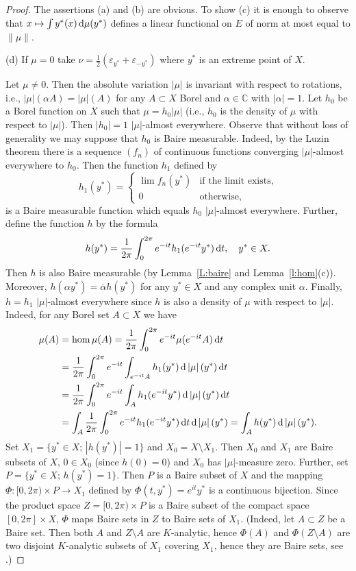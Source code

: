 \documentclass{amsart}
\numberwithin{equation}{section}
\theoremstyle{definition}
\def\ce{\mathbb C}
\def\ep{\varepsilon}
\def\ov{\overline}
\def\hom{\operatorname{hom}}
\def\di{\,\mbox{\rm d}}
\newcommand{\abs}[1]{\left| #1  \right|}
\newcommand{\setsep}{;\,}
\begin{document}
\begin{proof} The assertions (a) and (b) are obvious.
 To show (c) it is enough to observe that $x\mapsto \int y^*(x)\di\mu(y^*)$
 defines a linear functional on $E$ of norm at most equal to $\|\mu\|$.

(d) If $\mu=0$ take $\nu=\frac12(\ep_{y^*}+\ep_{-y^*})$ where $y^*$ is an extreme point of $X$.

Let $\mu\ne0$. Then the absolute variation $\abs{\mu}$ is invariant with respect to rotations, i.e., $\abs{\mu}(\alpha A)=\abs{\mu}(A)$ for any $A\subset X$ Borel and $\alpha\in\ce$ with $\abs{\alpha}=1$. Let $h_0$ be a Borel function on $X$ such that $\mu=h_0\abs{\mu}$ (i.e., $h_0$ is the density of $\mu$ with respect to $\abs{\mu}$). Then $\abs{h_0}=1$ $\abs{\mu}$-almost everywhere. Observe that without loss of generality we may suppose that $h_0$ is Baire measurable. Indeed, by the Luzin theorem there is a sequence $(f_n)$ of continuous functions converging $\abs{\mu}$-almost everywhere to $h_0$. Then the function $h_1$ defined by
$$h_1(y^*)=\begin{cases}\lim f_n(y^*) &\mbox{if the limit exists},\\ 0  &\mbox{otherwise},\end{cases}$$
is a Baire measurable function which equals $h_0$ $\abs{\mu}$-almost everywhere. Further, define the function $h$ by the formula
$$
h(y^*)=\frac1{2\pi}\int_0^{2\pi}e^{-it}h_1(e^{-it}y^*)\di t,\quad y^*\in X.
$$
Then $h$ is also Baire measurable (by Lemma~\ref{L:baire} and Lemma~\ref{l:hom}(c)). Moreover, $h(\alpha y^*)=\ov{\alpha}h(y^*)$ for any $y^*\in X$ and any complex unit $\alpha$. Finally, $h=h_1$ $\abs{\mu}$-almost everywhere since $h$ is also a density of $\mu$ with respect to $\abs{\mu}$. Indeed, for any Borel set $A\subset X$ we have
$$\begin{aligned}
\mu(A)&=\hom\mu(A)=\frac1{2\pi}\int_0^{2\pi}e^{-it}\mu(e^{-it}A) \di t
\\&=\frac1{2\pi}\int_0^{2\pi}e^{-it}\int_{e^{-it}A} h_1(y^*)\di\abs{\mu}(y^*) \di t
\\&=\frac1{2\pi}\int_0^{2\pi}e^{-it}\int_{A} h_1(e^{-it}y^*)\di\abs{\mu}(y^*) \di t
\\&=\int_{A}\frac1{2\pi}\int_0^{2\pi}e^{-it}h_1(e^{-it}y^*) \di t\di\abs{\mu}(y^*)
=\int_A h(y^*)\di\abs{\mu}(y^*).
\end{aligned}$$
Set $X_1=\{y^*\in X\setsep \abs{h(y^*)}=1\}$ and $X_0=X\setminus X_1$. Then $X_0$ and $X_1$ are Baire subsets of $X$, $0\in X_0$ (since $h(0)=0$) and $X_0$ has $\abs{\mu}$-measure zero. Further, set $P=\{y^*\in X\setsep h(y^*)=1\}$. Then $P$ is a Baire subset of $X$ and the mapping $\Phi:[0,2\pi)\times P\to X_1$ defined by
$\Phi(t,y^*)=e^{it}y^*$ is a continuous bijection. Since the product space $Z=[0,2\pi)\times P$ is a Baire subset of the compact space $[0,2\pi]\times X$, $\Phi$ maps Baire sets in $Z$ to Baire sets of $X_1$. (Indeed, let $A\subset Z$ be a Baire set. Then both $A$ and $Z\setminus A$ are $K$-analytic,
hence $\Phi(A)$ and $\Phi(Z\setminus A)$ are two disjoint $K$-analytic subsets of $X_1$ covering $X_1$, hence they are Baire sets, see \cite[Theorems 4.10 and 5.8]{frolikcmj}.)


\end{proof}
\end{document}
